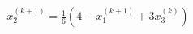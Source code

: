 \documentclass[preview]{standalone}
\begin{document}
\begin{align*}
x_2^{(k+1)} = \frac{1}{6} \left( 4 - x_1^{(k+1)} + 3x_3^{(k)} \right)
\end{align*}
\end{document}
